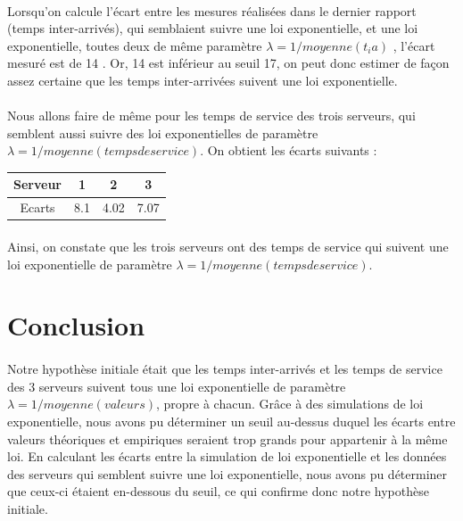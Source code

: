 \documentclass{article}
\begin{document}
\paragraph{}
Lorsqu’on calcule l’écart entre les mesures réalisées dans le dernier rapport (temps inter-arrivés), qui semblaient suivre une loi exponentielle,  et une loi exponentielle, toutes deux de même paramètre $ \lambda = 1/moyenne(t_ia)$ , l’écart mesuré est de 14 . Or, 14 est inférieur au seuil 17, on peut donc estimer de façon assez certaine que les temps inter-arrivées suivent une loi exponentielle.

\paragraph{}
Nous allons faire de même pour les temps de service des trois serveurs, qui semblent aussi suivre des loi exponentielles de paramètre
 $\lambda = 1/moyenne(temps de service)$. On obtient les écarts suivants :
\begin{center}
\begin{tabular}{cccc}
Serveur & 1 & 2 & 3 \\
\hline
Ecarts & 8.1 & 4.02 & 7.07 \\
\hline
\end{tabular}
\end{center}
\paragraph{}
Ainsi, on constate que les trois serveurs ont des temps de service qui suivent une loi exponentielle de paramètre $\lambda= 1/moyenne(temps de service)$.
\section{Conclusion}
\paragraph{}
Notre hypothèse initiale était que les temps inter-arrivés et les temps de service des 3 serveurs suivent tous une loi exponentielle de paramètre $\lambda=1/moyenne(valeurs)$, propre à chacun. Grâce à des simulations de loi exponentielle, nous avons pu déterminer un seuil au-dessus duquel les écarts entre valeurs théoriques et empiriques seraient trop grands pour appartenir à la même loi.  En calculant les écarts entre la simulation de loi exponentielle et les données des serveurs qui semblent suivre une loi exponentielle, nous avons pu déterminer que ceux-ci étaient en-dessous du seuil, ce qui confirme donc notre hypothèse initiale.
\end{document}
